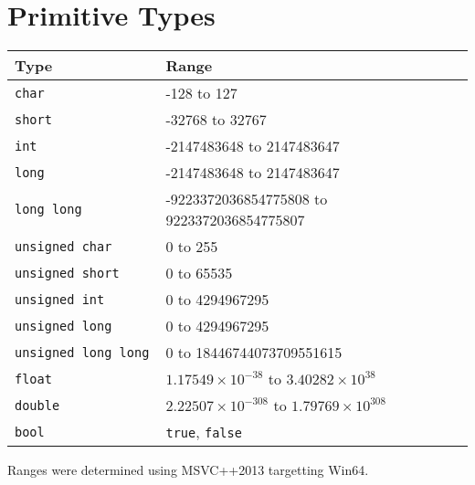 \chapter{Primitive Types}
\begin{center}
  \begin{tabular}{ll}
    \textbf{Type} & \textbf{Range} \\
    \toprule
    \tt char & -128 to 127 \\
    \tt short & -32768 to 32767 \\
    \tt int & -2147483648 to 2147483647 \\
    \tt long & -2147483648 to 2147483647 \\
    \tt long long & -9223372036854775808 to 9223372036854775807 \\
    \midrule
    \tt unsigned char & 0 to 255 \\
    \tt unsigned short & 0 to 65535 \\
    \tt unsigned int & 0 to 4294967295 \\
    \tt unsigned long & 0 to 4294967295 \\
    \tt unsigned long long & 0 to 18446744073709551615 \\
    \midrule
    \tt float & $1.17549 \times 10^{-38}$ to $3.40282 \times 10^{38}$ \\
    \tt double & $2.22507 \times 10^{-308}$ to $1.79769 \times 10^{308}$ \\
    \midrule
    \tt bool & {\tt true}, {\tt false} \\
    \bottomrule
  \end{tabular}
\end{center}
Ranges were determined using MSVC++2013 targetting Win64.
\begin{extra}
\end{extra}


